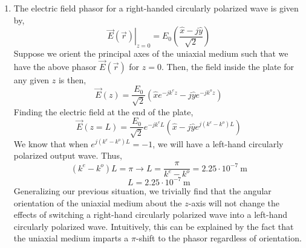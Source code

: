 \documentclass[12pt]{article}
\begin{document}
\begin{enumerate}
\begin{enumerate}
		\item [d.]
		The electric field phasor for a right-handed circularly polarized wave is given by,
		\[\left.\vec E(\vec r)\right|_{z=0}=E_0\left(\frac{\hat x - j\hat y}{\sqrt{2}}\right)\]
		Suppose we orient the principal axes of the uniaxial medium such that we have the above phasor $\vec E(\vec r)$ for $z=0$.
		Then, the field inside the plate for any given $z$ is then,
		\[\vec E(z)=\frac{E_0}{\sqrt{2}}(\hat x e^{-jk^ez}-j\hat ye^{-jk^oz})\]
		Finding the electric field at the end of the plate,
		\[\vec E(z=L)=\frac{E_0}{\sqrt{2}}e^{-jk^eL}\left(\hat x -j\hat ye^{j(k^e-k^o)L}\right)\]
		We know that when $e^{j(k^e-k^o)L}=-1$, we will have a left-hand circularly polarized output wave.
		Thus,
		\[(k^e-k^o)L = \pi \to L=\frac{\pi}{k^e-k^o}=2.25 \cdot 10^{-7}\:\mathrm{m}\]
		\[\boxed{L=2.25 \cdot 10^{-7} \: \mathrm{m}}\]
		Generalizing our previous situation, we trivially find that the angular orientation of the uniaxial medium about the $z$-axis will not change the effects of switching a right-hand circularly polarized wave into a left-hand circularly polarized wave.
		Intuitively, this can be explained by the fact that the uniaxial medium imparts a $\pi$-shift to the phasor regardless of orientation.

	\end{enumerate}

	
\end{enumerate}

		
\end{document}
